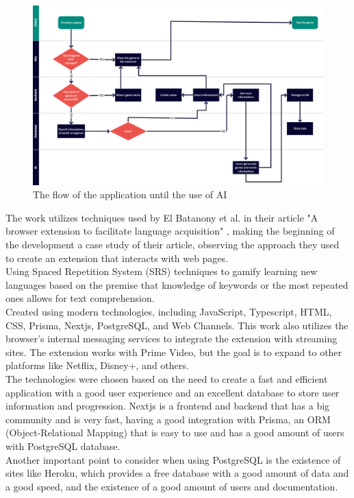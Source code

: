 \documentclass[12pt]{article}
\begin{document}
\begin{figure}[!h]
  \centering
  \caption{
    The flow of the application until the use of AI
  }
  \label{fig:flow_diagram}
  \includegraphics[width=1\textwidth]{assets/26.png}
\end{figure}
The work utilizes techniques used by El Batanony et al. in their article "A browser extension to facilitate language acquisition" \cite{ElBatanony21}, making the beginning of the development a case study of their article, observing the approach they used to create an extension that interacts with web pages.  \\
Using Spaced Repetition System (SRS) techniques to gamify learning new languages based on the premise that knowledge of keywords or the most repeated ones allows for text comprehension. \\
Created using modern technologies, including JavaScript, Typescript, HTML, CSS, Prisma, Nextjs, PostgreSQL, and Web Channels. This work also utilizes the browser's internal messaging services to integrate the extension with streaming sites. The extension works with Prime Video, but the goal is to expand to other platforms like Netflix, Disney+, and others. \\
The technologies were chosen based on the need to create a fast and efficient application with a good user experience and an excellent database to store user information and progression. Nextjs is a frontend and backend that has a big community and is very fast, having a good integration with Prisma, an ORM (Object-Relational Mapping) that is easy to use and has a good amount of users with PostgreSQL database. \\
Another important point to consider when using PostgreSQL is the existence of sites like Heroku, which provides a free database with a good amount of data and a good speed, and the existence of a good amount of users and documentation. \\
\end{document}
